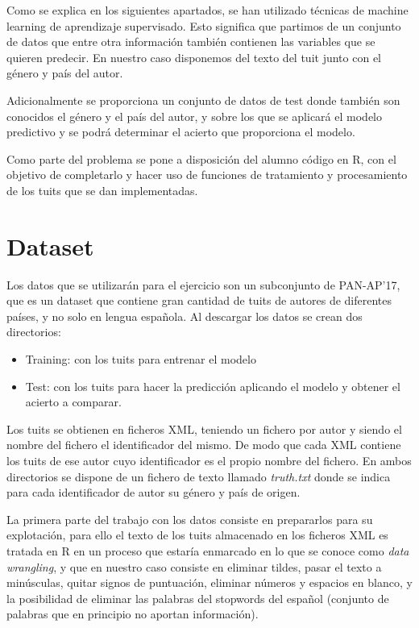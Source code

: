 \documentclass[11pt,a4paper]{article}
\begin{document}
Como se explica en los siguientes apartados, se han utilizado técnicas de machine learning de aprendizaje supervisado. Esto significa que partimos de un conjunto de datos que entre otra información también contienen las variables que se quieren predecir. En nuestro caso disponemos del texto del tuit junto con el género y  país del autor. 

Adicionalmente se proporciona un conjunto de datos de test donde también son conocidos el género y el país del autor, y sobre los que se aplicará el modelo predictivo y se podrá determinar el acierto que proporciona el modelo.

Como parte del problema se pone a disposición del alumno código en R, con el objetivo de completarlo y hacer uso de funciones de tratamiento y procesamiento de los tuits que se dan implementadas. 


\section{Dataset}

Los datos que se utilizarán para el ejercicio son un subconjunto de PAN-AP’17, que es un dataset que contiene gran cantidad de tuits de autores de diferentes países, y no solo en lengua española.
Al descargar los datos se crean dos directorios:

\begin{itemize}
 \item Training: con los tuits para entrenar el modelo
 \item Test: con los tuits para hacer la predicción aplicando el modelo y obtener el acierto a comparar.
\end{itemize}

Los tuits se obtienen en ficheros XML, teniendo un fichero por autor y siendo el nombre del fichero el identificador del mismo. De modo que cada XML contiene los tuits de ese autor cuyo identificador es el propio nombre del fichero. En ambos directorios se dispone de un fichero de texto llamado \textit{truth.txt} donde se indica para cada identificador de autor su género y país de origen.

La primera parte del trabajo con los datos consiste en prepararlos para su explotación, para ello el texto de los tuits almacenado en los ficheros XML es tratada en R en un proceso que estaría enmarcado en lo que se conoce como \textit{data wrangling}, y que en nuestro caso consiste en eliminar tildes, pasar el texto a minúsculas, quitar signos de puntuación, eliminar números y espacios en blanco, y la posibilidad de eliminar las palabras del stopwords del español (conjunto de palabras que en principio no aportan información). 
\end{document}
